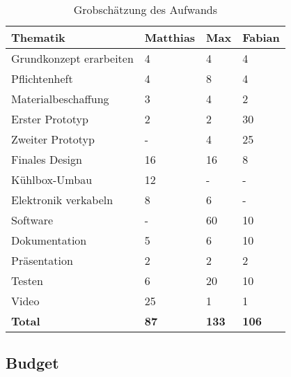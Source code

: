 \begin{table}[H]
    \centering
    \caption{Grobschätzung des Aufwands}
    \label{tab:my-table}
    \begin{tabular}{|l|l|l|l|}
    \hline
    \textbf{Thematik}         & \textbf{Matthias} & \textbf{Max} & \textbf{Fabian} \\ \hline
    Grundkonzept   erarbeiten & 4                 & 4            & 4               \\ \hline
    Pflichtenheft             & 4                 & 8            & 4               \\ \hline
    Materialbeschaffung       & 3                 & 4            & 2               \\ \hline
    Erster   Prototyp         & 2                 & 2            & 30              \\ \hline
    Zweiter   Prototyp        & -                 & 4            & 25              \\ \hline
    Finales   Design          & 16                & 16           & 8               \\ \hline
    Kühlbox-Umbau             & 12                & -            & -               \\ \hline
    Elektronik   verkabeln    & 8                 & 6            & -               \\ \hline
    Software                  & -                 & 60           & 10              \\ \hline
    Dokumentation             & 5                 & 6            & 10              \\ \hline
    Präsentation              & 2                 & 2            & 2               \\ \hline
    Testen                    & 6                 & 20           & 10              \\ \hline
    Video                     & 25                & 1            & 1               \\ \hline
    \textbf{Total}            & \textbf{87}       & \textbf{133} & \textbf{106}    \\ \hline
    \end{tabular}
    \end{table}

    \pagebreak

\subsection{Budget}

